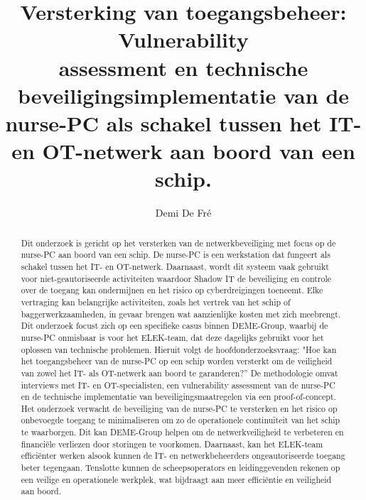 \documentclass{hogent-article}
\title{Versterking van toegangsbeheer: Vulnerability \\ assessment en technische beveiligingsimplementatie van de nurse-PC als schakel tussen het IT- en OT-netwerk aan boord van een schip.}
\author{Demi De Fré}
\begin{document}
\begin{abstract}
  Dit onderzoek is gericht op het versterken van de netwerkbeveiliging met focus op de nurse-PC aan boord van een schip. 
  De nurse-PC is een werkstation dat fungeert als schakel tussen het IT- en OT-netwerk. Daarnaast, wordt dit systeem vaak gebruikt voor niet-geautoriseerde 
  activiteiten waardoor Shadow IT de beveiliging en controle over de toegang kan ondermijnen en het risico op cyberdreigingen toeneemt. Elke vertraging kan 
  belangrijke activiteiten, zoals het vertrek van het schip of baggerwerkzaamheden, in gevaar brengen wat aanzienlijke kosten met zich meebrengt. Dit onderzoek 
  focust zich op een specifieke casus binnen DEME-Group, waarbij de nurse-PC onmisbaar is voor het ELEK-team, dat deze dagelijks gebruikt voor het oplossen van 
  technische problemen. Hieruit volgt de hoofdonderzoeksvraag: "Hoe kan het toegangsbeheer van de nurse-PC op een schip worden versterkt om de veiligheid van 
  zowel het IT- als OT-netwerk aan boord te garanderen?” De methodologie omvat interviews met IT- en OT-specialisten, een vulnerability assessment van de nurse-PC 
  en de technische implementatie van beveiligingsmaatregelen via een proof-of-concept. Het onderzoek verwacht de beveiliging van de nurse-PC te versterken 
  en het risico op onbevoegde toegang te minimaliseren om zo de operationele continuïteit van het schip te waarborgen. Dit kan DEME-Group helpen om de netwerkveiligheid 
  te verbeteren en financiële verliezen door storingen te voorkomen. Daarnaast, kan het ELEK-team efficiënter werken alsook kunnen de IT- en netwerkbeheerders 
  ongeautoriseerde toegang beter tegengaan. Tenslotte kunnen de scheepsoperators en leidinggevenden rekenen op een veilige en operationele werkplek, wat bijdraagt 
  aan meer efficiëntie en veiligheid aan boord.
\end{abstract}

\tableofcontents


\printbibliography
\end{document}

